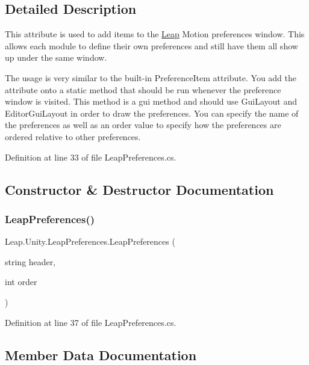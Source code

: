 \subsection{Detailed Description}
This attribute is used to add items to the \mbox{\hyperlink{namespace_leap_1_1_unity_1_1_leap}{Leap}} Motion preferences window. This allows each module to define their own preferences and still have them all show up under the same window. 

The usage is very similar to the built-\/in Preference\+Item attribute. You add the attribute onto a static method that should be run whenever the preference window is visited. This method is a gui method and should use Gui\+Layout and Editor\+Gui\+Layout in order to draw the preferences. You can specify the name of the preferences as well as an order value to specify how the preferences are ordered relative to other preferences. 

Definition at line 33 of file Leap\+Preferences.\+cs.



\subsection{Constructor \& Destructor Documentation}
\mbox{\label{class_leap_1_1_unity_1_1_leap_preferences_a674e95b66eac493a3445f06e327ee646}} 
\subsubsection{\texorpdfstring{LeapPreferences()}{LeapPreferences()}}
{\footnotesize\ttfamily Leap.\+Unity.\+Leap\+Preferences.\+Leap\+Preferences (\begin{DoxyParamCaption}\item[{string}]{header,  }\item[{int}]{order }\end{DoxyParamCaption})}



Definition at line 37 of file Leap\+Preferences.\+cs.



\subsection{Member Data Documentation}
\mbox{\label{class_leap_1_1_unity_1_1_leap_preferences_a325204caecdc471866bf089231b597fa}} 
